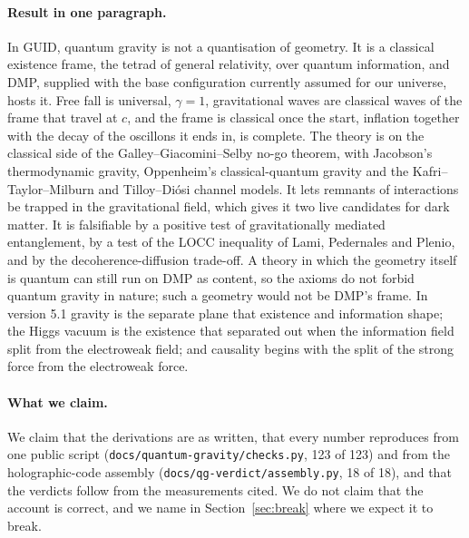 \documentclass[11pt,a4paper]{article}
\theoremstyle{definition}
\theoremstyle{remark}
\newcommand{\nw}[1]{{\color{newc}#1}}
\newcommand{\vtag}{{\color{newc}\textsf{\scriptsize[v5.1]}}}
\theoremstyle{definition}
\begin{document}
\paragraph{Result in one paragraph.} In GUID, quantum gravity is not a quantisation of geometry. It is a classical existence frame, the
tetrad of general relativity, over quantum information, and DMP, supplied with the base configuration currently assumed for our universe,
hosts it. Free fall is universal, $\gamma=1$, gravitational waves are classical waves of the frame that travel at $c$, and the frame is
classical once the start, inflation together with the decay of the oscillons it ends in, is complete. The theory is on the classical side of
the Galley--Giacomini--Selby no-go theorem, with Jacobson's thermodynamic gravity, Oppenheim's classical-quantum gravity and the
Kafri--Taylor--Milburn and Tilloy--Di\'osi channel models. It lets remnants of interactions be trapped in the gravitational field, which gives
it two live candidates for dark matter. It is falsifiable by a positive test of gravitationally mediated entanglement, by a test of the LOCC
inequality of Lami, Pedernales and Plenio, and by the decoherence-diffusion trade-off. A theory in which the geometry itself is quantum can
still run on DMP as content, so the axioms do not forbid quantum gravity in nature; such a geometry would not be DMP's frame.
\nw{\vtag{} In version 5.1 gravity is the separate plane that existence and information shape; the Higgs vacuum is the existence that
separated out when the information field split from the electroweak field; and causality begins with the split of the strong force from
the electroweak force.}

\paragraph{What we claim.} We claim that the derivations are as written, that every number reproduces from one public script
(\texttt{docs/quantum-gravity/checks.py}, \nw{123 of 123}) and from the holographic-code assembly (\texttt{docs/qg-verdict/assembly.py},
18 of 18), and that the verdicts follow from the measurements cited. We do not claim that the account is correct, and we name in
Section~\ref{sec:break} where we expect it to break.
\end{document}
